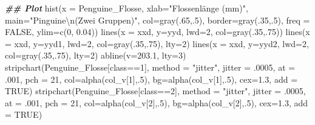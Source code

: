 \documentclass[
  ngerman,
]{book}
\newenvironment{Shaded}{\begin{snugshade}}{\end{snugshade}}
\newcommand{\AttributeTok}[1]{\textcolor[rgb]{0.77,0.63,0.00}{#1}}
\newcommand{\ConstantTok}[1]{\textcolor[rgb]{0.00,0.00,0.00}{#1}}
\newcommand{\DecValTok}[1]{\textcolor[rgb]{0.00,0.00,0.81}{#1}}
\newcommand{\DocumentationTok}[1]{\textcolor[rgb]{0.56,0.35,0.01}{\textbf{\textit{#1}}}}
\newcommand{\FloatTok}[1]{\textcolor[rgb]{0.00,0.00,0.81}{#1}}
\newcommand{\FunctionTok}[1]{\textcolor[rgb]{0.00,0.00,0.00}{#1}}
\newcommand{\NormalTok}[1]{#1}
\newcommand{\SpecialCharTok}[1]{\textcolor[rgb]{0.00,0.00,0.00}{#1}}
\newcommand{\StringTok}[1]{\textcolor[rgb]{0.31,0.60,0.02}{#1}}
\begin{document}
\begin{Shaded}
\begin{Highlighting}[]
\DocumentationTok{\#\# Plot}
\FunctionTok{hist}\NormalTok{(}\AttributeTok{x =}\NormalTok{ Penguine\_Flosse, }\AttributeTok{xlab=}\StringTok{"Flossenlänge (mm)"}\NormalTok{, }\AttributeTok{main=}\StringTok{"Pinguine}\SpecialCharTok{\textbackslash{}n}\StringTok{(Zwei Gruppen)"}\NormalTok{,}
     \AttributeTok{col=}\FunctionTok{gray}\NormalTok{(.}\DecValTok{65}\NormalTok{,.}\DecValTok{5}\NormalTok{), }\AttributeTok{border=}\FunctionTok{gray}\NormalTok{(.}\DecValTok{35}\NormalTok{,.}\DecValTok{5}\NormalTok{), }\AttributeTok{freq =} \ConstantTok{FALSE}\NormalTok{, }\AttributeTok{ylim=}\FunctionTok{c}\NormalTok{(}\DecValTok{0}\NormalTok{, }\FloatTok{0.04}\NormalTok{))}
\FunctionTok{lines}\NormalTok{(}\AttributeTok{x =}\NormalTok{ xxd, }\AttributeTok{y=}\NormalTok{yyd, }\AttributeTok{lwd=}\DecValTok{2}\NormalTok{, }\AttributeTok{col=}\FunctionTok{gray}\NormalTok{(.}\DecValTok{35}\NormalTok{,.}\DecValTok{75}\NormalTok{))}
\FunctionTok{lines}\NormalTok{(}\AttributeTok{x =}\NormalTok{ xxd, }\AttributeTok{y=}\NormalTok{yyd1, }\AttributeTok{lwd=}\DecValTok{2}\NormalTok{, }\AttributeTok{col=}\FunctionTok{gray}\NormalTok{(.}\DecValTok{35}\NormalTok{,.}\DecValTok{75}\NormalTok{), }\AttributeTok{lty=}\DecValTok{2}\NormalTok{)}
\FunctionTok{lines}\NormalTok{(}\AttributeTok{x =}\NormalTok{ xxd, }\AttributeTok{y=}\NormalTok{yyd2, }\AttributeTok{lwd=}\DecValTok{2}\NormalTok{, }\AttributeTok{col=}\FunctionTok{gray}\NormalTok{(.}\DecValTok{35}\NormalTok{,.}\DecValTok{75}\NormalTok{), }\AttributeTok{lty=}\DecValTok{2}\NormalTok{)}
\FunctionTok{abline}\NormalTok{(}\AttributeTok{v=}\FloatTok{203.1}\NormalTok{, }\AttributeTok{lty=}\DecValTok{3}\NormalTok{)}
\FunctionTok{stripchart}\NormalTok{(Penguine\_Flosse[class}\SpecialCharTok{==}\DecValTok{1}\NormalTok{], }\AttributeTok{method =} \StringTok{"jitter"}\NormalTok{, }\AttributeTok{jitter =}\NormalTok{ .}\DecValTok{0005}\NormalTok{, }\AttributeTok{at =}\NormalTok{ .}\DecValTok{001}\NormalTok{,}
           \AttributeTok{pch =} \DecValTok{21}\NormalTok{, }\AttributeTok{col=}\FunctionTok{alpha}\NormalTok{(col\_v[}\DecValTok{1}\NormalTok{],.}\DecValTok{5}\NormalTok{), }\AttributeTok{bg=}\FunctionTok{alpha}\NormalTok{(col\_v[}\DecValTok{1}\NormalTok{],.}\DecValTok{5}\NormalTok{), }\AttributeTok{cex=}\FloatTok{1.3}\NormalTok{, }\AttributeTok{add =} \ConstantTok{TRUE}\NormalTok{)}
\FunctionTok{stripchart}\NormalTok{(Penguine\_Flosse[class}\SpecialCharTok{==}\DecValTok{2}\NormalTok{], }\AttributeTok{method =} \StringTok{"jitter"}\NormalTok{, }\AttributeTok{jitter =}\NormalTok{ .}\DecValTok{0005}\NormalTok{, }\AttributeTok{at =}\NormalTok{ .}\DecValTok{001}\NormalTok{,}
           \AttributeTok{pch =} \DecValTok{21}\NormalTok{, }\AttributeTok{col=}\FunctionTok{alpha}\NormalTok{(col\_v[}\DecValTok{2}\NormalTok{],.}\DecValTok{5}\NormalTok{), }\AttributeTok{bg=}\FunctionTok{alpha}\NormalTok{(col\_v[}\DecValTok{2}\NormalTok{],.}\DecValTok{5}\NormalTok{), }\AttributeTok{cex=}\FloatTok{1.3}\NormalTok{, }\AttributeTok{add =} \ConstantTok{TRUE}\NormalTok{)}
\end{Highlighting}
\end{Shaded}
\end{document}
